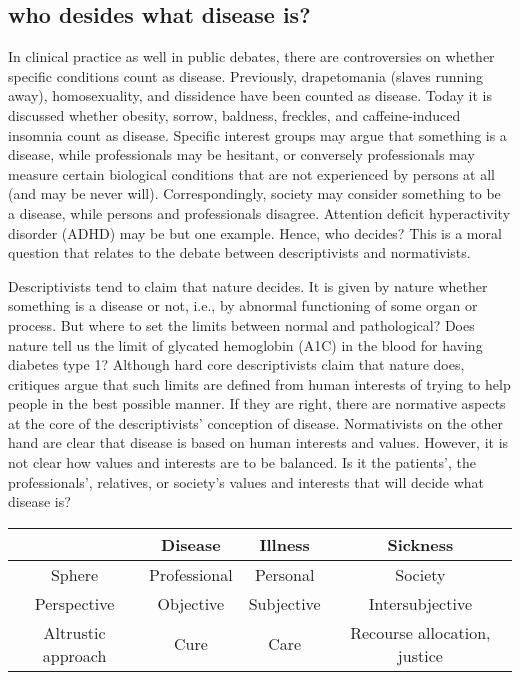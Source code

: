\documentclass[conference]{IEEEtran}
\begin{document}
\subsection{who desides what disease is?}
In clinical practice as well in public debates, there are controversies on whether speciﬁc conditions count as disease. Previously, drapetomania (slaves running away), homosexuality, and dissidence have been counted as disease. Today it is discussed whether obesity, sorrow, baldness, freckles, and caffeine-induced insomnia count as disease. Speciﬁc interest groups may argue that something is a disease, while professionals may be hesitant, or conversely professionals may measure certain biological conditions that are not experienced by persons at all (and may be never will). Correspondingly, society may consider something to be a disease, while persons and professionals disagree. Attention deﬁcit hyperactivity disorder (ADHD) may be but one example. Hence, who decides? This is a moral question that relates to the debate between descriptivists and normativists.

Descriptivists tend to claim that nature decides. It is given by nature whether something is a disease or not, i.e., by abnormal functioning of some organ or process. But where to set the limits between normal and pathological? Does nature tell us the limit of glycated hemoglobin (A1C) in the blood for having diabetes type 1? Although hard core descriptivists claim that nature does, critiques argue that such limits are deﬁned from human interests of trying to help people in the best possible manner. If they are right, there are normative aspects at the core of the \cite{b4}descriptivists’ conception of disease. Normativists on the other hand are clear that disease is based on human interests and values. However, it is not clear how values and interests are to be balanced. Is it the patients’, the professionals’, relatives, or society’s values and interests that will decide what disease is?


\begin{center}
\begin{tabular}{ |c|c|c|c| } 
\hline
&Disease & Illness & Sickness \\
\hline
Sphere & Professional & Personal & Society \\ 
Perspective & Objective & Subjective & Intersubjective \\ 
Altrustic approach&Cure& Care & Recourse allocation, justice \\ 
\hline
\end{tabular}
\end{center}
\end{document}
